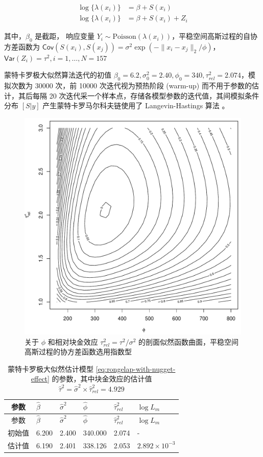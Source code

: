 \documentclass[12pt,a4paper,UTF8,twoside]{book}
\theoremstyle{definition}
\theoremstyle{definition}
\theoremstyle{definition}
\theoremstyle{remark}
\begin{document}
\begin{align}
\log\{\lambda(x_{i})\}& =  \beta + S(x_{i}) \label{eq:rongelap-without-nugget-effect}\\
\log\{\lambda(x_{i})\}& =  \beta + S(x_{i}) + Z_{i} \label{eq:rongelap-with-nugget-effect}
\end{align}

\noindent 其中，\(\beta_0\) 是截距， 响应变量
\(Y_{i} \sim \mathrm{Poisson}( \lambda(x_i) )\)，平稳空间高斯过程的自协方差函数为
\(\mathsf{Cov}( S(x_i), S(x_j) ) = \sigma^2 \exp( -\|x_i -x_j\|_{2} / \phi )\)，\(\mathsf{Var}( Z_{i} ) = \tau^2, i = 1, \ldots, N = 157\)

蒙特卡罗极大似然算法迭代的初值
\(\beta_{0} = 6.2,\sigma^2_{0} = 2.40,\phi_{0} = 340,\tau^2_{rel} = 2.074\)，模拟次数为
30000 次，前 10000 次迭代视为预热阶段 (warm-up)
而不用于参数的估计，其后每隔 20
次迭代采一个样本点，存储各模型参数的迭代值，其间模拟条件分布 \([S|y]\)
产生蒙特卡罗马尔科夫链使用了 Langevin-Hastings 算法 \citep{Omiros2003}。

\begin{figure}

{\centering \includegraphics[width=0.7\linewidth]{figures/profile-phitausq} 

}

\caption{关于 \(\phi\) 和相对块金效应
\(\tau^2_{rel} = \tau^2 / \sigma^2\)
的剖面似然函数曲面，平稳空间高斯过程的协方差函数选用指数型}\label{fig:profile-phi-tausq}
\end{figure}





\begin{longtable}[]{@{}clllll@{}}
\caption{\label{tab:rangelap-mcml-result} 蒙特卡罗极大似然估计模型
\eqref{eq:rongelap-with-nugget-effect} 的参数，其中块金效应的估计值
\(\hat{\tau}^2 = \hat{\sigma}^{2} \times \hat{\tau}^2_{rel} = 4.929\)}\tabularnewline
\toprule
参数 & \(\hat{\beta}\) & \(\hat{\sigma}^{2}\) & \(\hat{\phi}\) &
\(\hat{\tau}^2_{rel}\) & \(\log L_{m}\)\tabularnewline
\midrule
\endfirsthead
\toprule
参数 & \(\hat{\beta}\) & \(\hat{\sigma}^{2}\) & \(\hat{\phi}\) &
\(\hat{\tau}^2_{rel}\) & \(\log L_{m}\)\tabularnewline
\midrule
\endhead
初始值 & 6.200 & 2.400 & 340.000 & 2.074 & -\tabularnewline
估计值 & 6.190 & 2.401 & 338.126 & 2.053 &
\(2.892 \times 10^{-3}\)\tabularnewline
\bottomrule
\end{longtable}
\end{document}

